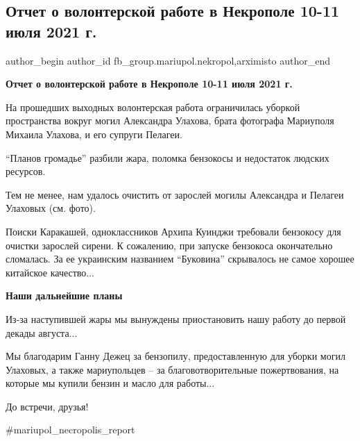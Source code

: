  
 
 
 
 

\subsection{Отчет о волонтерской работе в Некрополе 10-11 июля 2021 г.}
\label{sec:17_07_2021.fb.fb_group.mariupol.nekropol.1.otchet_volonter_rabota_10_11_iulja}
 
\ifcmt
 author_begin
   author_id fb_group.mariupol.nekropol,arximisto
 author_end
\fi

\textbf{Отчет о волонтерской работе в Некрополе 10-11 июля 2021 г.}

На прошедших выходных волонтерская работа ограничилась уборкой пространства
вокруг могил Александра Улахова, брата фотографа Мариуполя Михаила Улахова, и
его супруги Пелагеи.

\enquote{Планов громадье} разбили жара, поломка бензокосы и недостаток людских ресурсов.

Тем не менее, нам удалось очистить от зарослей могилы Александра и Пелагеи Улаховых (см. фото).

Поиски Каракашей, одноклассников Архипа Куинджи требовали бензокосу для очистки
зарослей сирени. К сожалению, при запуске бензокоса окончательно сломалась. За
ее украинским названием \enquote{Буковина} скрывалось не самое хорошее китайское
качество...

\textbf{Наши дальнейшие планы}

Из-за наступившей жары мы вынуждены приостановить нашу работу до первой декады августа...

Мы благодарим Ганну Дежец за бензопилу, предоставленную для уборки могил
Улаховых, а также мариупольцев – за благовотворительные пожертвования, на
которые мы купили бензин и масло для работы...

До встречи, друзья!

\#mariupol\_necropolis\_report

